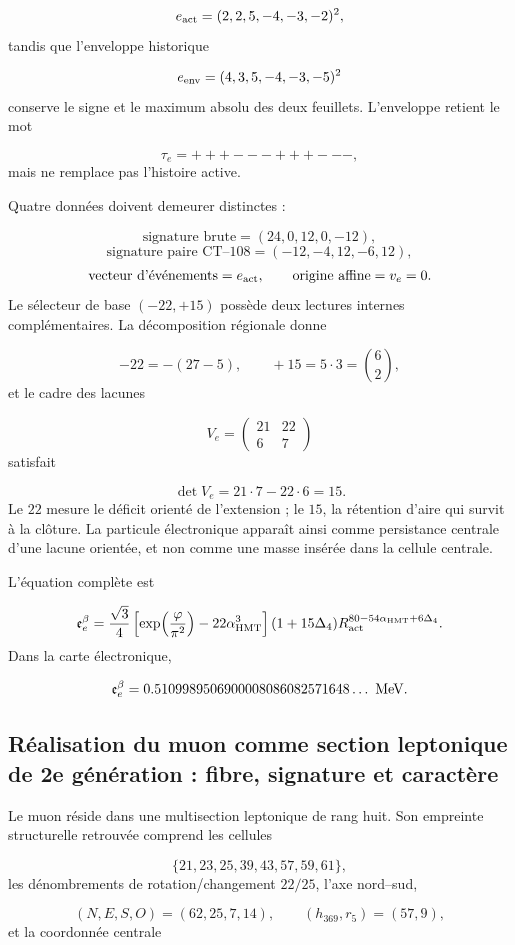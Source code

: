 \[
 e_{\rm act}=(2,2,5,-4,-3,-2)^2,
\]
tandis que l'enveloppe historique

\[
 e_{\rm env}=(4,3,5,-4,-3,-5)^2
\]
conserve le signe et le maximum absolu des deux feuillets. L'enveloppe retient le mot

\[
 \tau_e=+++---+++---,
\]
mais ne remplace pas l'histoire active.

Quatre données doivent demeurer distinctes :

\[
 \text{signature brute}=(24,0,12,0,-12),
\]
\[
 \text{signature paire CT--108}=(-12,-4,12,-6,12),
\]
\[
 \text{vecteur d'événements}=e_{\rm act},
\qquad
 \text{origine affine}=v_e=0.
\]
Le sélecteur de base \((-22,+15)\) possède deux lectures internes complémentaires. La décomposition régionale donne

\[
 -22=-(27-5),\qquad +15=5\cdot3=\binom62,
\]
et le cadre des lacunes

\[
 V_e=
 \begin{pmatrix}
 21&22\\
 6&7
 \end{pmatrix}
\]
satisfait

\[
 \det V_e=21\cdot7-22\cdot6=15.
\]
Le \(22\) mesure le déficit orienté de l'extension ; le \(15\), la rétention d'aire qui survit à la clôture. La particule électronique apparaît ainsi comme persistance centrale d'une lacune orientée, et non comme une masse insérée dans la cellule centrale.

L'équation complète est

\[
 \mathfrak e_e^\beta=
 \frac{\sqrt3}{4}
 \left[
 \exp\!\left(\frac{\varphi}{\pi^2}\right)
 -22\alpha_{\rm HMT}^{3}
 \right]
 (1+15\Delta_4)
 R_{\rm act}^{80-54\alpha_{\rm HMT}+6\Delta_4}.
\]
Dans la carte électronique,

\[
 \mathfrak e_e^\beta
 =0.5109989506900008086082571648\ldots\ {\rm MeV}.
\]
\subsection{Réalisation du muon comme section leptonique de 2e génération : fibre, signature et caractère}
Le muon réside dans une multisection leptonique de rang huit. Son empreinte structurelle retrouvée comprend les cellules

\[
 \{21,23,25,39,43,57,59,61\},
\]
les dénombrements de rotation/changement \(22/25\), l'axe nord--sud,

\[
 (N,E,S,O)=(62,25,7,14),
\qquad
 (h_{369},r_5)=(57,9),
\]
et la coordonnée centrale

